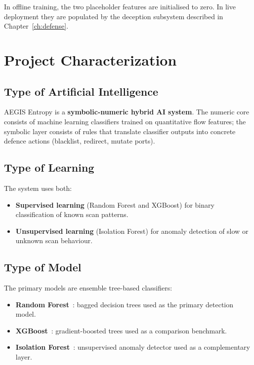 \documentclass[12pt,a4paper]{report}
\begin{document}
In offline training, the two placeholder features are initialised to zero. In live deployment they are populated by the deception subsystem described in Chapter~\ref{ch:defense}.

\section{Project Characterization}

\subsection{Type of Artificial Intelligence}

AEGIS Entropy is a \textbf{symbolic-numeric hybrid AI system}. The numeric core consists of machine learning classifiers trained on quantitative flow features; the symbolic layer consists of rules that translate classifier outputs into concrete defence actions (blacklist, redirect, mutate ports).

\subsection{Type of Learning}

The system uses both:

\begin{itemize}
    \item \textbf{Supervised learning} (Random Forest and XGBoost) for binary classification of known scan patterns.
    \item \textbf{Unsupervised learning} (Isolation Forest) for anomaly detection of slow or unknown scan behaviour.
\end{itemize}

\subsection{Type of Model}

The primary models are ensemble tree-based classifiers:

\begin{itemize}
    \item \textbf{Random Forest}~\cite{breiman2001}: bagged decision trees used as the primary detection model.
    \item \textbf{XGBoost}~\cite{chen2016}: gradient-boosted trees used as a comparison benchmark.
    \item \textbf{Isolation Forest}~\cite{liu2008}: unsupervised anomaly detector used as a complementary layer.
\end{itemize}
\end{document}

